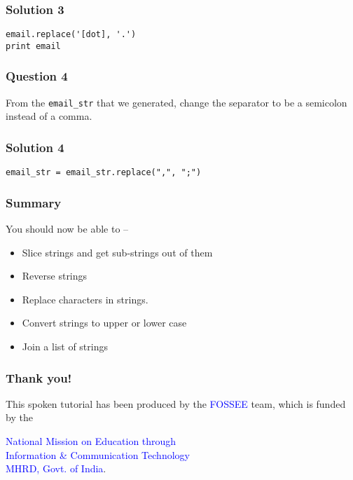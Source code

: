 \documentclass[presentation]{beamer}
\begin{document}
\begin{frame}[fragile]
\frametitle{Solution 3}
\label{sec-7}

\lstset{language=Python}
\begin{lstlisting}
email.replace('[dot], '.')
print email
\end{lstlisting}
\end{frame}
\begin{frame}
\frametitle{Question 4}
\label{sec-8}

  From the \texttt{email\_str} that we generated, change the separator to be a
  semicolon instead of a comma.
\end{frame}
\begin{frame}[fragile]
\frametitle{Solution 4}
\label{sec-9}

\lstset{language=Python}
\begin{lstlisting}
email_str = email_str.replace(",", ";")
\end{lstlisting}
\end{frame}
\begin{frame}
\frametitle{Summary}
\label{sec-10}

  You should now be able to --
\begin{itemize}
\item Slice strings and get sub-strings out of them
\item Reverse strings
\item Replace characters in strings.
\item Convert strings to upper or lower case
\item Join a list of strings
\end{itemize}
\end{frame}
\begin{frame}
\frametitle{Thank you!}
\label{sec-11}

  \begin{block}{}
  \begin{center}
  This spoken tutorial has been produced by the
  \textcolor{blue}{FOSSEE} team, which is funded by the 
  \end{center}
  \begin{center}
    \textcolor{blue}{National Mission on Education through \\
      Information \& Communication Technology \\ 
      MHRD, Govt. of India}.
  \end{center}  
  \end{block}
\end{frame}
\end{document}
